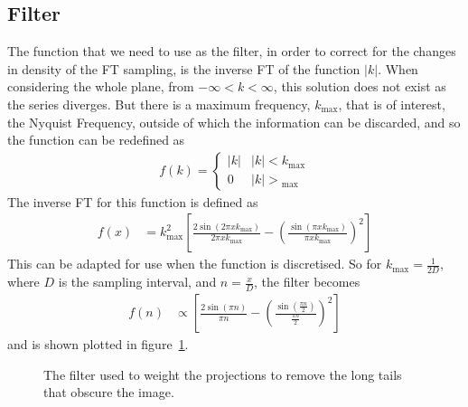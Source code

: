     \subsection{Filter} %
    \label{sub:filter}
        The function that we need to use as the filter, in order to correct for the changes in density of the FT sampling, is the inverse FT of the function $|k|$. When considering the whole plane, from $-\infty < k < \infty$, this solution does not exist as the series diverges. But there is a maximum frequency, $k_\max$, that is of interest, the Nyquist Frequency, outside of which the information can be discarded, and so the function can be redefined as
        \begin{align}
            f(k) =
                \begin{cases}
                    |k| & |k| < k{_\max} \\
                    0   & |k| > {_\max}
                \end{cases}
        \end{align}
        The inverse FT for this function is defined as
        \begin{align}
            f(x) &= k^2_{\max} \left[ \frac{2\sin(2\pi xk_{\max})}{2\pi xk_{\max}} - \left( \frac{\sin(\pi xk_{\max})}{\pi xk_{\max}} \right)^2 \right]
        \end{align}
        This can be adapted for use when the function is discretised. So for $k_\max =\frac{1}{2D}$, where $D$ is the sampling interval, and $n=\frac{x}{D}$, the filter becomes
        \begin{align}
            f(n) &\propto \left[ \frac{2\sin(\pi n)}{\pi n} - \left( \frac{\sin(\frac{\pi n}{2})}{\frac{\pi n}{2}} \right)^2 \right]
        \end{align}
        and is shown plotted in figure~\ref{fig:filter_graph}.
        \begin{figure}[ht]
            \centering
                \begingroup{}
                \resizebox{0.7\textwidth}{!}{%
                    
                }\endgroup
            \caption{The filter used to weight the projections to remove the long tails that obscure the image.\label{fig:filter_graph}}
        \end{figure}
